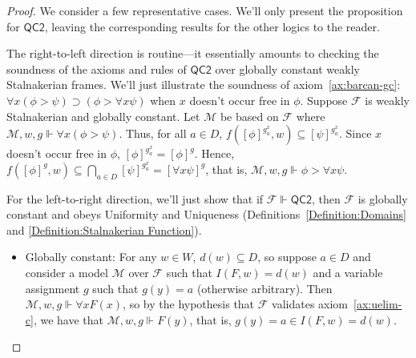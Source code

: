 \documentclass[12pt]{article}
\newcommand{\tup}[1]{\langle #1 \rangle}
\newcommand{\would}{\mathbin{>}}
\newcommand{\then}{\mathbin{\supset}}
\begin{document}
\begin{proof}
    We consider a few representative cases. 
    We'll only present the proposition for $\mathsf{QC2}$, leaving the corresponding results for the other logics to the reader. 
    

    The right-to-left direction is routine---it essentially amounts to checking the soundness of the axioms and rules of $\mathsf{QC2}$ over globally constant weakly Stalnakerian frames. 
    We'll just illustrate the soundness of axiom~\ref{ax:barcan-gc}: $\forall x(\phi \would \psi) \then (\phi \would \forall x\psi)$ when $x$ doesn't occur free in $\phi$. 
    Suppose $\mathcal{F}$ is weakly Stalnakerian and globally constant. 
    Let $\mathcal{M}$ be based on $\mathcal{F}$ where $\mathcal{M},w,g \Vdash \forall x(\phi \would \psi)$. 
    Thus, for all $a \in D$, $f([\phi]^{g^x_a},w) \subseteq [\psi]^{g^x_a}$. 
    Since $x$ doesn't occur free in $\phi$, $[\phi]^{g^x_a} = [\phi]^g$. 
    Hence, $f([\phi]^g,w) \subseteq \bigcap_{a \in D} [\psi]^{g^x_a} = [\forall x\psi]^g$, that is, $\mathcal{M},w,g \Vdash \phi \would \forall x\psi$. 

    For the left-to-right direction, we'll just show that if $\mathcal{F} \Vdash \mathsf{QC2}$, then $\mathcal{F}$ is globally constant and obeys Uniformity and Uniqueness (Definitions~\ref{Definition:Domains} and \ref{Definition:Stalnakerian Function}). 
    \begin{itemize}
        \item Globally constant: For any $w\in W$, $d(w)\subseteq{D}$, so suppose $a\in D$ and consider a model $\mathcal{M}$ over $\mathcal{F}$ such that $I(F,w) = d(w)$ and a variable assignment $g$ such that $g(y) = a$ (otherwise arbitrary). Then $\mathcal{M},w,g \Vdash \forall{x}F(x)$, so by the hypothesis that $\mathcal{F}$ validates axiom~\ref{ax:uelim-c}, we have that $\mathcal{M},w,g \Vdash F(y)$, that is, $g(y) = a \in I(F,w) = d(w)$. 


\end{itemize}
\end{proof}
\end{document}
